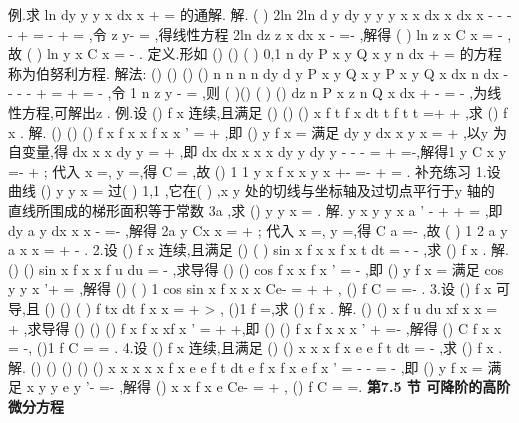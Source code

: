 \textcolor{lyred}{例}.求
ln
dy
y
y
x
dx
x
+
=
的通解. 
解.
(
)
2ln
2ln
d y
dy
y
y
y
x
x
dx
x
dx
x
-
-
-
-
+
=
\Leftrightarrow -
+
=
,令
z
y-
=
,得线性方程 
2ln
dz
z
x
dx
x
-
\cdots 
=-
,解得
(
)
ln
z
x C
x
=
-
,故
(
)
ln
y
x C
x
=
-
. 
\textcolor{lyred}{定义}.形如
()
()
(
)
0,1
n
dy
P x y
Q x y
n
dx +
=
\neq 
的方程称为\textcolor{lyred}{伯努利方程}. 
\textcolor{lyred}{解法}:
()
()
()
()
n
n
n
n
dy
d
y
P x y
Q x
y
P x y
Q x
dx
n dx
-
-
-
-
+
=
\Leftrightarrow 
\cdots 
+
=
-
,令
1 n
z
y -
=
,则 
(
)()
(
)
()
dz
n P x z
n Q x
dx +
-
=
-
,为线性方程,可解出z . 
\textcolor{lyred}{例}.设
()
f x 连续,且满足
()
()
()
x
f t
f x
dt
t f t
t
=+
+
\int 
,求
()
f x . 
解.
()
()
()
f x
f
x
x f x
x
'
=
+
,即
()
y
f x
=
满足
dy
y
dx
x y
x
=
+
,以y 为自变量,得 
dx
x
x
dy
y
=
+
,即
dx
dx
x
x
x
dy
y
dy
y
-
-
-
=
\Rightarrow 
+
=-,解得1
y
C
x
y
=-
+
; 
代入
x =,
y =,得
C =
,故
()
1 1
y
x
f x
x
y
x
+-
=-
+
\Rightarrow 
=
. 
\textcolor{lyred}{补充练习 }
1.设曲线
()
y
y x
=
过(
)
1,1 ,它在(
)
,x y 处的切线与坐标轴及过切点平行于y 轴的 
直线所围成的梯形面积等于常数
3a ,求
()
y
y x
=
. 
解.
y x
y
y x
a
'
-
\cdots +
+
\cdots 
=
,即
dy
a
y
dx
x
x
-
=-
,解得
2a
y
Cx
x
=
+
; 
代入
x =,
y =,得
C
a
=-
,故
(
)
1 2
a
y
a
x
x
=
+
-
. 
2.设
()
f x 连续,且满足
()
(
)
sin
x
f x
x
f x
t dt
=
-
-
\int 
,求
()
f x . 
解.
()
()
sin
x
f x
x
f u du
=
-\int 
,求导得
()
()
cos
f
x
x
f x
'
=
-
,即
()
y
f x
=
满足 
cos
y
y
x
'+
=
,解得
()
(
)
1 cos
sin
x
f x
x
x
Ce-
=
+
+
,
()
f
C
=
\Rightarrow 
=-
. 
3.设
()
f x 可导,且
()
()
(
)
f tx dt
f x
x
=
+
>
\int 
,
()1
f
=,求
()
f x . 
解.
()
()
x
f u du
xf x
x
=
+
\int 
,求导得
()
()
()
f x
f x
xf
x
'
=
+
+,即 
()
()
f
x
f x
x
x
'
+
=-
,解得
()
C
f x
x
=
-,
()1
f
C
=\Rightarrow 
=
. 
4.设
()
f x 连续,且满足
()
()
x
x
x
f x
e
e
f
t dt
=
-\int 
,求
()
f x . 
解.
()
()
()
()
()
x
x
x
x
x
f
x
e
e
f
t dt
e f
x
f x
e f
x
'
=
-
-
=
-
\int 
,即
()
y
f x
=
满足 
x
y
y
e y
'-
=-
,解得
()
x
x
f x
e
Ce-
=
+
,
()
f
C
=\Rightarrow 
=. 
\vspace{6pt}
{\large \bfseries \textcolor{lyred}{第7.5 节 可降阶的高阶微分方程}}

